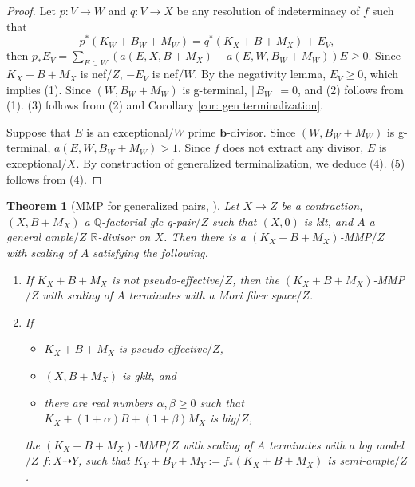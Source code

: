 \documentclass[11pt]{amsart}
\numberwithin{equation}{section}
\newcommand{\bb}{\bm{b}}
\newcommand{\Qq}{\mathbb{Q}}
\newcommand{\Rr}{\mathbb{R}}
\newtheorem{thm}{Theorem}[section]
\theoremstyle{definition}
\theoremstyle{remark}
\theoremstyle{definition}
\begin{document}
\begin{proof}
Let 
$p: V\rightarrow W$ and $q: V\rightarrow X$ be any resolution of indeterminacy of $f$ such that
$$p^*(K_W+B_W+M_W)=q^*(K_X+B+M_X)+E_V,$$
then $p_*E_V=\sum_{E\subset W}(a(E,X,B+M_X)-a(E,W,B_W+M_W))E\geq 0$. Since $K_X+B+M_X$ is nef$/Z$, $-E_V$ is nef$/W$. By the negativity lemma, $E_V\geq 0$, which implies (1). Since $(W,B_W+M_W)$ is g-terminal, $\lfloor B _W\rfloor=0$, and (2) follows from (1). (3) follows from (2) and Corollary \ref{cor: gen terminalization}. 

Suppose that $E$ is an exceptional$/W$ prime $\bb$-divisor. Since $(W,B_W+M_W)$ is g-terminal, $a(E,W,B_W+M_W)>1$. Since $f$ does not extract any divisor, $E$ is exceptional$/X$. By construction of generalized terminalization, we deduce (4). (5) follows from (4).
\end{proof}

\begin{thm}[MMP for generalized pairs, {\cite[Lemma 4.4(1)(2)]{BZ16}}]\label{thm: gen pair mmp}
Let $X\rightarrow Z$ be a contraction, $(X,B+M_X)$ a $\Qq$-factorial glc g-pair$/Z$ such that $(X,0)$ is klt, and $A$ a general ample$/Z$ $\Rr$-divisor on $X$. Then there is a $(K_X+B+M_X)$-MMP$/Z$ with scaling of $A$ satisfying the following.
\begin{enumerate}
    \item If $K_X+B+M_X$ is not pseudo-effective$/Z$, then the $(K_X+B+M_X)$-MMP$/Z$ with scaling of $A$ terminates with a Mori fiber space$/Z$.
    \item If
    \begin{itemize}
    \item $K_X+B+M_X$ is pseudo-effective$/Z$, 
        \item $(X,B+M_X)$ is gklt, and
        \item there are real numbers $\alpha,\beta\geq 0$ such that $K_X+(1+\alpha)B+(1+\beta)M_X$ is big$/Z$,
    \end{itemize}
    the $(K_X+B+M_X)$-MMP$/Z$ with scaling of $A$ terminates with a log model$/Z$ $f: X\dashrightarrow Y$, such that $K_Y+B_Y+M_Y:=f_*(K_X+B+M_X)$ is semi-ample$/Z$.
\end{enumerate}
\end{thm}
\end{document}
